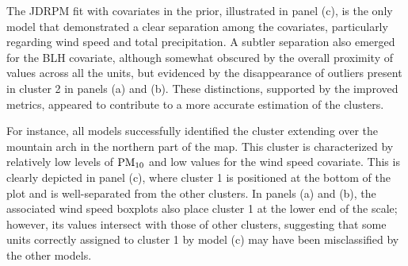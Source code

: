 \documentclass[12pt,	%
	a4paper,		%
	twoside,		%
	openright,		%
	titlepage,%
	]{book}
\theoremstyle{definition}
\begin{document}
The JDRPM fit with covariates in the prior, illustrated in panel (c), is the only model that demonstrated a clear separation among the covariates, particularly regarding wind speed and total precipitation. A subtler separation also emerged for the BLH covariate, although somewhat obscured by the overall proximity of values across all the units, but evidenced by the disappearance of outliers present in cluster 2 in panels (a) and (b). These distinctions, supported by the improved metrics, appeared to contribute to a more accurate estimation of the clusters.

For instance, all models successfully identified the cluster extending over the mountain arch in the northern part of the map. This cluster is characterized by relatively low levels of $\text{PM}_{10}$ and low values for the wind speed covariate. This is clearly depicted in panel (c), where cluster 1 is positioned at the bottom of the plot and is well-separated from the other clusters. In panels (a) and (b), the associated wind speed boxplots also place cluster 1 at the lower end of the scale; however, its values intersect with those of other clusters, suggesting that some units correctly assigned to cluster 1 by model (c) may have been misclassified by the other models.
\end{document}
